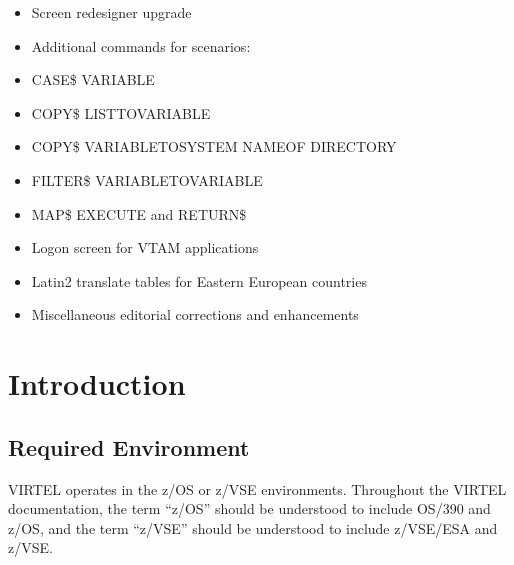 \documentclass[letterpaper,10pt,english]{sphinxmanual}
\begin{document}
\sphinxAtStartPar
{}
\begin{itemize}
\item {} 
\sphinxAtStartPar
Screen redesigner upgrade

\item {} 
\sphinxAtStartPar
Additional commands for scenarios:

\item {} 
\sphinxAtStartPar
CASE\$ VARIABLE

\item {} 
\sphinxAtStartPar
COPY\$ LIST\sphinxhyphen{}TO\sphinxhyphen{}VARIABLE

\item {} 
\sphinxAtStartPar
COPY\$ VARIABLE\sphinxhyphen{}TO\sphinxhyphen{}SYSTEM NAME\sphinxhyphen{}OF DIRECTORY

\item {} 
\sphinxAtStartPar
FILTER\$ VARIABLE\sphinxhyphen{}TO\sphinxhyphen{}VARIABLE

\item {} 
\sphinxAtStartPar
MAP\$ EXECUTE and RETURN\$

\end{itemize}

\sphinxAtStartPar
{}
\begin{itemize}
\item {} 
\sphinxAtStartPar
Logon screen for VTAM applications

\item {} 
\sphinxAtStartPar
Latin\sphinxhyphen{}2 translate tables for Eastern European countries

\item {} 
\sphinxAtStartPar
Miscellaneous editorial corrections and enhancements

\end{itemize}


\chapter{Introduction}
\label{\detokenize{Installation_Guide:introduction}}\label{\detokenize{Installation_Guide:virtel461ig-introduction}}
\ignorespaces 

\section{Required Environment}
\label{\detokenize{Installation_Guide:required-environment}}\label{\detokenize{Installation_Guide:index-0}}
\sphinxAtStartPar
VIRTEL operates in the z/OS or z/VSE environments. Throughout the VIRTEL documentation, the term “z/OS” should be understood to include OS/390 and z/OS, and the term “z/VSE” should be understood to include z/VSE/ESA and z/VSE.
\end{document}
